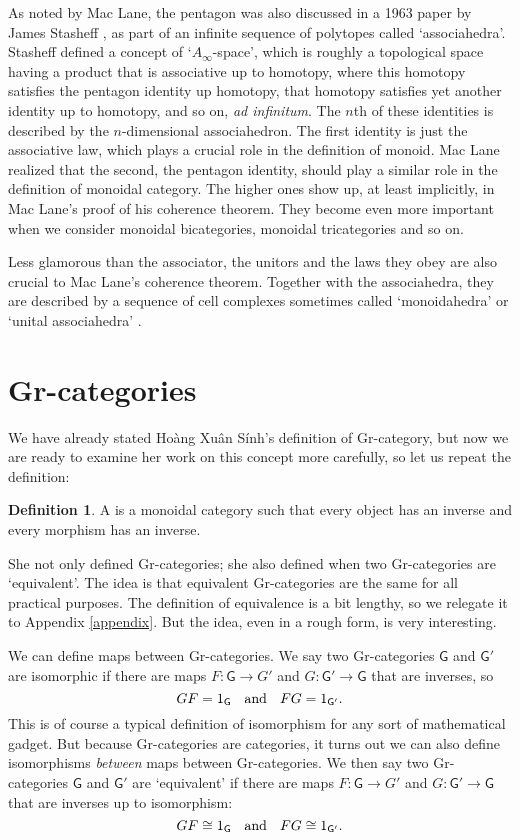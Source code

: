 \documentclass[reqno,12pt]{amsart}
\newcommand{\maps}{\colon}    %
\newcommand{\G}{{\mathsf{G}}}   %
\newcommand{\define}[1]{\textbf{\boldmath{#1}}}
\theoremstyle{definition}
\newtheorem{defn}[thm]{Definition}
\begin{document}
As noted by Mac Lane, the pentagon was also discussed in a 1963 paper by James Stasheff \cite{S63}, as part of an infinite sequence of polytopes called
`associahedra'.  Stasheff defined a concept of `$A_\infty$-space',
which is roughly a topological space having a product that is
associative up to homotopy, where this homotopy satisfies the pentagon
identity up homotopy, that homotopy satisfies yet another identity up
to homotopy, and so on, \textit{ad infinitum}.  The $n$th of these
identities is described by the $n$-dimensional associahedron.  The
first identity is just the associative law, which plays a crucial role
in the definition of monoid.  Mac Lane realized that the second, the pentagon
identity, should play a similar role in the definition of monoidal
category.  The higher ones show up, at least implicitly, in Mac Lane's
proof of his coherence theorem.  They become even more important when
we consider monoidal bicategories, monoidal tricategories and so on.  

Less glamorous than the associator, the unitors and the laws they obey
are also crucial to Mac Lane's coherence theorem.  Together with the associahedra, they are described by a sequence of cell complexes sometimes called `monoidahedra' \cite{T99} or `unital associahedra' \cite{MT11}.    

\section{Gr-categories}
\label{sec:Gr}

We have already stated Ho\`ang Xu\^an S\'inh's definition of Gr-category, but now we are ready to examine her work on this concept more carefully, so let us repeat the definition:

\begin{defn}
A \define{Gr-category} is a monoidal category such that every object has an inverse and every morphism has an inverse.
\end{defn}

She not only defined Gr-categories; she also defined when two Gr-categories are `equivalent'.    The idea is that equivalent Gr-categories are the same for all practical purposes.   The definition of equivalence is a bit lengthy, so we relegate it to Appendix \ref{appendix}.   But the idea, even in a rough form, is very interesting.  

We can define maps between Gr-categories.   We say two Gr-categories $\G$ and $\G'$ are isomorphic if there are maps $F \maps \G \to G'$ and $G \maps \G' \to \G$ that are inverses, so
\[    GF = 1_\G \textrm{ \; and \; } FG = 1_{\G'}   .\]
This is of course a typical definition of isomorphism for any sort of mathematical gadget.  But because Gr-categories are categories, it turns out we can also define isomorphisms \emph{between} maps between Gr-categories.  We then say two Gr-categories $\G$ and $\G'$ are `equivalent' if there are maps $F \maps \G \to G'$ and $G \maps \G' \to \G$ that are inverses up to isomorphism:
\[    GF \cong 1_\G \textrm{ \; and \; } FG \cong 1_{\G'}   .\]
\end{document}
